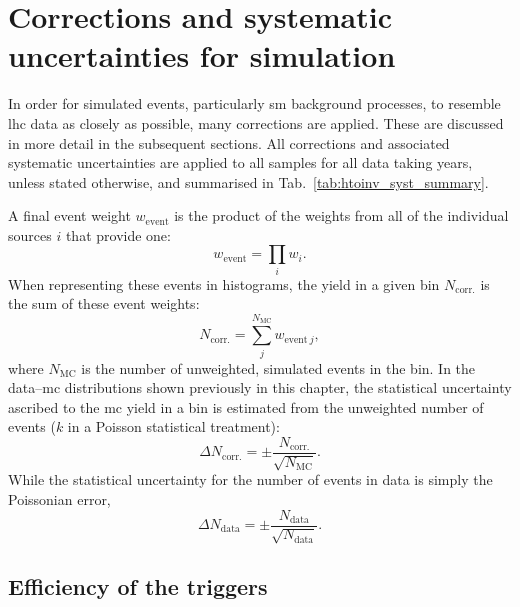 \section{Corrections and systematic uncertainties for simulation}
\label{sec:htoinv_mc_corrections}

In order for simulated events, particularly \acrshort{sm} background processes, to resemble \acrshort{lhc} data as closely as possible, many corrections are applied. These are discussed in more detail in the subsequent sections. All corrections and associated systematic uncertainties are applied to all samples for all data taking years, unless stated otherwise, and summarised in Tab.~\ref{tab:htoinv_syst_summary}.

A final event weight $w_{\mathrm{event}}$ is the product of the weights from all of the individual sources $i$ that provide one:
\begin{equation}
    w_{\mathrm{event}} = \prod_i w_i.
    \label{eq:event_weight}
\end{equation}
When representing these events in histograms, the yield in a given bin $N_{\mathrm{corr.}}$ is the sum of these event weights:
\begin{equation}
    N_{\mathrm{corr.}} = \sum_j^{N_{\mathrm{MC}}} w_{\mathrm{event} \ j},
    \label{eq:bin_weight}
\end{equation}
where $N_{\mathrm{MC}}$ is the number of unweighted, simulated events in the bin. In the data--\acrshort{mc} distributions shown previously in this chapter, the statistical uncertainty ascribed to the \acrshort{mc} yield in a bin is estimated from the unweighted number of events ($k$ in a Poisson statistical treatment):
\begin{equation}
    \Delta N_{\mathrm{corr.}} = \pm \frac{ N_{\mathrm{corr.}} }{ \sqrt{N_{\mathrm{MC}}} }.
    \label{eq:uncertainty_mc_ours}
\end{equation}
While the statistical uncertainty for the number of events in data is simply the Poissonian error,
\begin{equation}
    \Delta N_{\mathrm{data}} = \pm \frac{ N_{\mathrm{data}} }{ \sqrt{N_{\mathrm{data}}} }.
    \label{eq:uncertainty_data}
\end{equation}




\subsection{Efficiency of the triggers}
\label{subsec:htoinv_trigger_effs}

